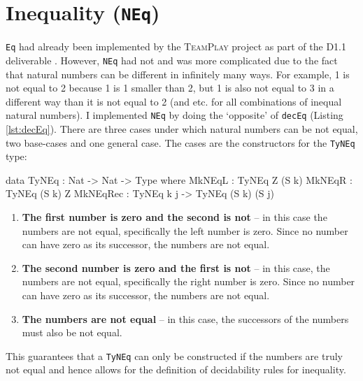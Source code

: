 \section{Inequality (\texttt{NEq})}
    \texttt{Eq} had already been implemented by the \textsc{TeamPlay} project as part of the D1.1 deliverable \cite{teamplay:d1.1}. However, \texttt{NEq} had not and was more complicated due to the fact that natural numbers can be different in infinitely many ways. For example, 1 is not equal to 2 because 1 is 1 smaller than 2, but 1 is also not equal to 3 in a different way than it is not equal to 2 (and etc. for all combinations of inequal natural numbers). I implemented \texttt{NEq} by doing the `opposite' of \texttt{decEq} (Listing \ref{lst:decEq}). There are three cases under which natural numbers can be not equal, two base-cases and one general case. The cases are the constructors for the \texttt{TyNEq} type:
    \begin{code}[caption={\texttt{TyNEq}} -- proving inequality.]
        data TyNEq : Nat -> Nat -> Type where
        MkNEqL   : TyNEq Z (S k)
        MkNEqR   : TyNEq (S k) Z
        MkNEqRec : TyNEq k j -> TyNEq (S k) (S j)
    \end{code}
    \begin{enumerate}
        \item \textbf{The first number is zero and the second is not} -- in this case the numbers are not equal, specifically the left number is zero. Since no number can have zero as its successor, the numbers are not equal.
        \item \textbf{The second number is zero and the first is not} -- in this case, the numbers are not equal, specifically the right number is zero. Since no number can have zero as its successor, the numbers are not equal.
        \item \textbf{The numbers are not equal} -- in this case, the successors of the numbers must also be not equal.
    \end{enumerate}
    This guarantees that a \texttt{TyNEq} can only be constructed if the numbers are truly not equal and hence allows for the definition of decidability rules for inequality.
